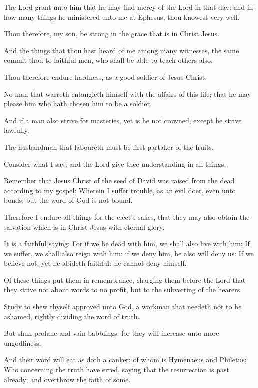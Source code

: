 \Verse The Lord grant unto him that he may find mercy of the Lord in that day: and in how many things he ministered unto me at Ephesus, thou knowest very well.


\Chapter
\Verse Thou therefore, my son, be strong in the grace that is in Christ Jesus.

\Verse And the things that thou hast heard of me among many witnesses, the same commit thou to faithful men, who shall be able to teach others also.

\Verse Thou therefore endure hardness, as a good soldier of Jesus Christ.

\Verse No man that warreth entangleth himself with the affairs of this life; that he may please him who hath chosen him to be a soldier.

\Verse And if a man also strive for masteries, yet is he not crowned, except he strive lawfully.

\Verse The husbandman that laboureth must be first partaker of the fruits.

\Verse Consider what I say; and the Lord give thee understanding in all things.

\Verse Remember that Jesus Christ of the seed of David was raised from the dead according to my gospel: \Verse Wherein I suffer trouble, as an evil doer, even unto bonds; but the word of God is not bound.

\Verse Therefore I endure all things for the elect's sakes, that they may also obtain the salvation which is in Christ Jesus with eternal glory.

\Verse It is a faithful saying: For if we be dead with him, we shall also live with him: \Verse If we suffer, we shall also reign with him: if we deny him, he also will deny us: \Verse If we believe not, yet he abideth faithful: he cannot deny himself.

\Verse Of these things put them in remembrance, charging them before the Lord that they strive not about words to no profit, but to the subverting of the hearers.

\Verse Study to shew thyself approved unto God, a workman that needeth not to be ashamed, rightly dividing the word of truth.

\Verse But shun profane and vain babblings: for they will increase unto more ungodliness.

\Verse And their word will eat as doth a canker: of whom is Hymenaeus and Philetus; \Verse Who concerning the truth have erred, saying that the resurrection is past already; and overthrow the faith of some.

